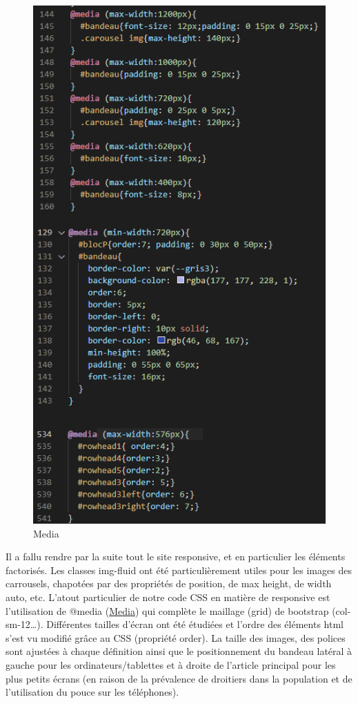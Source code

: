 \documentclass[12pt]{report}
\begin{document}
\bigskip
\par
\begin{figure}
\hypertarget{fig-media}{}
\includegraphics[width=0.9\linewidth]{figures/pt-media.png}
\caption{Media}
\end{figure}
Il a fallu rendre par la suite tout le site responsive, et en particulier les éléments factorisés. Les classes img-fluid ont été particulièrement utiles pour les images des carrousels, chapotées par des propriétés de position, de max height, de width auto, etc. L’atout particulier de notre code CSS en matière de responsive est l’utilisation de @media (\hyperlink{fig-media}{Media}) qui complète le maillage (grid) de bootstrap (col-sm-12…). Différentes tailles d’écran ont été étudiées et l’ordre des éléments html s’est vu modifié grâce au CSS (propriété order). La taille des images, des polices sont ajustées à chaque définition ainsi que le positionnement du bandeau latéral à gauche pour les ordinateurs/tablettes et à droite de l’article principal pour les plus petits écrans (en raison de la prévalence de droitiers dans la population et de l’utilisation du pouce sur les téléphones).
\end{document}
